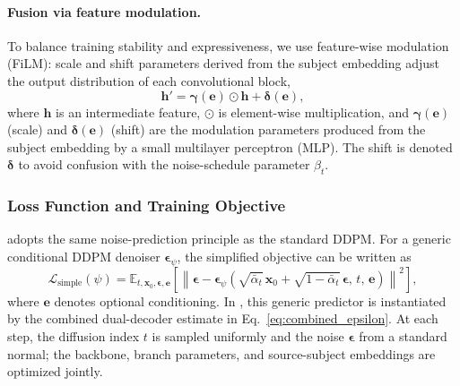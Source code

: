 \paragraph{Fusion via feature modulation.} To balance training stability and
expressiveness, we use feature-wise modulation (FiLM): scale and shift
parameters derived from the subject embedding adjust the output distribution of
each convolutional block,
\begin{equation}
  \mathbf{h}'=\boldsymbol{\gamma}(\mathbf{e})\odot\mathbf{h}+\boldsymbol{\delta}(\mathbf{e}),
  \label{eq:film}
\end{equation}
where $\mathbf{h}$ is an intermediate feature, $\odot$ is element-wise
multiplication, and $\boldsymbol{\gamma}(\mathbf{e})$ (scale) and
$\boldsymbol{\delta}(\mathbf{e})$ (shift) are the modulation parameters produced
from the subject embedding by a small multilayer perceptron (MLP). The shift is
denoted $\boldsymbol{\delta}$ to avoid confusion with the noise-schedule
parameter $\beta_t$.

\subsubsection{Loss Function and Training Objective}
\label{sec:method_loss}
\saddpm{} adopts the same noise-prediction principle as the standard DDPM\@. For
a generic conditional DDPM denoiser $\boldsymbol{\epsilon}_{\psi}$, the simplified
objective can be written as
\begin{equation}
  \mathcal{L}_{\text{simple}}(\psi)=
  \mathbb{E}_{t,\mathbf{x}_0,\boldsymbol{\epsilon},\mathbf{e}}\!\left[
  \left\|\boldsymbol{\epsilon}-
  \boldsymbol{\epsilon}_{\psi}\!\left(
  \sqrt{\bar{\alpha}_t}\,\mathbf{x}_0+
  \sqrt{1-\bar{\alpha}_t}\,\boldsymbol{\epsilon},\,t,\,\mathbf{e}
  \right)\right\|^{2}\right],
  \label{eq:lsimple}
\end{equation}
where $\mathbf{e}$ denotes optional conditioning. In \saddpm{}, this generic
predictor is instantiated by the combined dual-decoder estimate in
Eq.~\eqref{eq:combined_epsilon}. At each step, the diffusion index $t$ is sampled
uniformly and the noise $\boldsymbol{\epsilon}$ from a standard normal; the
backbone, branch parameters, and source-subject embeddings are optimized jointly.

